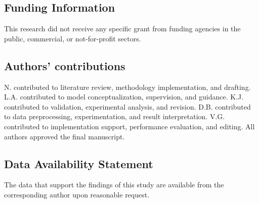 \documentclass[default, iicol]{sn-jnl}
\theoremstyle{thmstyleone}%
\theoremstyle{thmstyletwo}%
\theoremstyle{thmstylethree}%
\begin{document}
\subsection{Funding Information}
This research did not receive any specific grant from funding agencies in the public, commercial, or not-for-profit sectors.

\subsection{Authors' contributions}
N. contributed to literature review, methodology implementation, and drafting. L.A. contributed to model conceptualization, supervision, and guidance. K.J. contributed to validation, experimental analysis, and revision. D.B. contributed to data preprocessing, experimentation, and result interpretation. V.G. contributed to implementation support, performance evaluation, and editing. All authors approved the final manuscript.
\subsection{Data Availability Statement}
The data that support the findings of this study are available from the corresponding author upon reasonable request.
\end{document}
